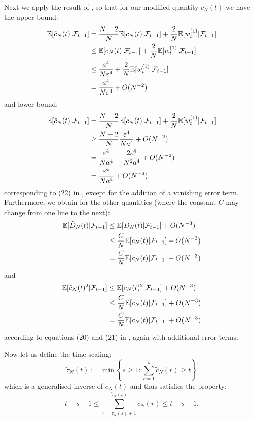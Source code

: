\documentclass[fleqn]{article}
\newcommand{\E}{\mathbb{E}}
\newcommand{\F}{\mathcal{F}_{t-1}}
\newcommand{\wt}[2][t]{w_{#1}^{(#2)}}
\begin{document}
Next we apply the result of \citet[Lemma 3]{koskela2018}, so that for our modified quantity $\tilde{c}_N(t)$ we have the upper bound:
\begin{align}\label{eq:cN_upper}
\E[\tilde{c}_N(t) |\F] &= \frac{N-2}{N} \E[c_N(t) |\F] + \frac{2}{N} \E[\wt{1} |\F] \notag\\
& \leq \E[c_N(t) |\F] + \frac{2}{N} \E[\wt{1} |\F] \notag\\
&\leq \frac{a^4}{N\varepsilon^4} +  \frac{2}{N} \E[\wt{1} |\F] \notag\\
&= \frac{a^4}{N\varepsilon^4} + O(N^{-2})
\end{align}
and lower bound:
\begin{align}\label{eq:cN_lower}
\E[\tilde{c}_N(t) |\F] &= \frac{N-2}{N} \E[c_N(t) |\F] + \frac{2}{N} \E[\wt{1} |\F] \notag\\
& \geq  \frac{N-2}{N}\frac{\varepsilon^4}{Na^4} + O(N^{-2}) \notag\\
& = \frac{\varepsilon^4}{Na^4} - \frac{2\varepsilon^4}{N^2a^4} + O(N^{-2}) \notag\\
& = \frac{\varepsilon^4}{Na^4} + O(N^{-2})
\end{align}
corresponding to (22) in \citet{koskela2018}, except for the addition of a vanishing error term.
Furthermore, we obtain for the other quantities (where the constant $C$ may change from one line to the next):
\begin{align}\label{eq:DN_upper}
\E[\tilde{D}_N(t) |\F] &\leq \E[D_N(t) |\F] + O(N^{-3}) \notag\\
&\leq \frac{C}{N} \E[c_N(t) |\F] + O(N^{-3}) \notag\\
&= \frac{C}{N} \E[\tilde{c}_N(t) |\F] + O(N^{-3})
\end{align}
and
\begin{align}\label{eq:cN2_upper}
\E[\tilde{c}_N(t)^2 |\F] &\leq \E[c_N(t)^2 |\F] + O(N^{-3}) \notag\\
&\leq \frac{C}{N} \E[c_N(t) |\F] + O(N^{-3}) \notag\\
&= \frac{C}{N} \E[\tilde{c}_N(t) |\F] + O(N^{-3})
\end{align}
according to equations (20) and (21) in \citet{koskela2018}, again with additional error terms.

Now let us define the time-scaling:
\begin{equation*}
\tilde{\tau}_N(t) := \min\left\{ s\geq 1 : \sum_{r=1}^s \tilde{c}_N(r) \geq t \right\}
\end{equation*}
which is a generalised inverse of $\tilde{c}_N(t)$ and thus satisfies the property:
\begin{equation}\label{eq:sum_tau_cN_upperlower}
t-s-1 \leq \sum_{r=\tilde{\tau}_N(s)+1}^{\tilde{\tau}_N(t)} \tilde{c}_N(r) \leq t-s +1 .
\end{equation}
\end{document}
